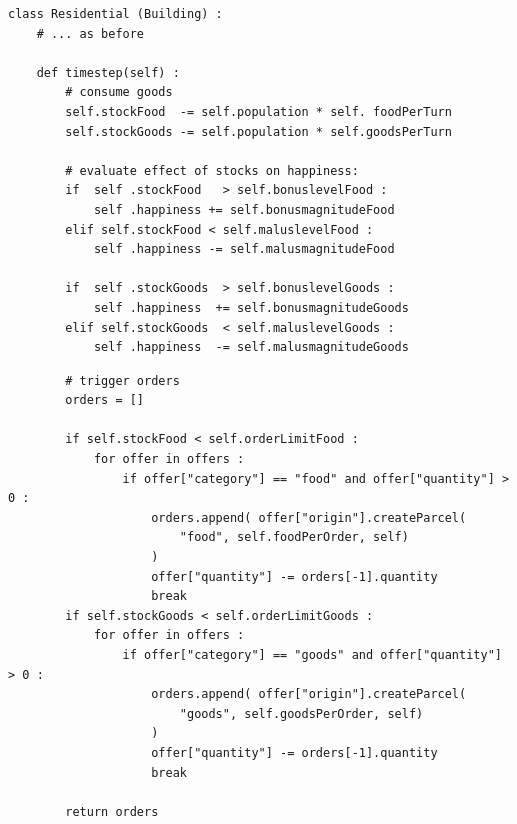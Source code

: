 \begin{frame}[fragile]
%
\begin{codebox}
\begin{verbatim}
class Residential (Building) :
    # ... as before
    
    def timestep(self) :
        # consume goods
        self.stockFood  -= self.population * self. foodPerTurn
        self.stockGoods -= self.population * self.goodsPerTurn
        
        # evaluate effect of stocks on happiness:
        if  self .stockFood   > self.bonuslevelFood :
            self .happiness += self.bonusmagnitudeFood
        elif self.stockFood < self.maluslevelFood :
            self .happiness -= self.malusmagnitudeFood
        
        if  self .stockGoods  > self.bonuslevelGoods :
            self .happiness  += self.bonusmagnitudeGoods
        elif self.stockGoods  < self.maluslevelGoods :
            self .happiness  -= self.malusmagnitudeGoods
\end{verbatim}
\end{codebox}
%
\end{frame}


\begin{frame}[fragile]
%
\begin{codebox}
\begin{verbatim}
        # trigger orders
        orders = []

        if self.stockFood < self.orderLimitFood :
            for offer in offers :
                if offer["category"] == "food" and offer["quantity"] > 0 :
                    orders.append( offer["origin"].createParcel(
                        "food", self.foodPerOrder, self)
                    )
                    offer["quantity"] -= orders[-1].quantity
                    break
        if self.stockGoods < self.orderLimitGoods :
            for offer in offers :
                if offer["category"] == "goods" and offer["quantity"] > 0 :
                    orders.append( offer["origin"].createParcel(
                        "goods", self.goodsPerOrder, self)
                    )
                    offer["quantity"] -= orders[-1].quantity
                    break
        
        return orders
\end{verbatim}
\end{codebox}
%
\end{frame}

